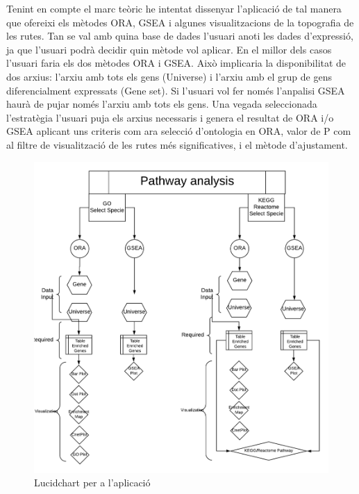 Tenint en compte el marc teòric he intentat dissenyar l'aplicació de tal manera que ofereixi els mètodes \gls{ORA}, \gls{GSEA} i algunes visualitzacions de la topografia de les rutes. Tan se val amb quina base de dades l'usuari anoti les dades d'expressió, ja que l'usuari podrà decidir quin mètode vol aplicar. En el millor dels casos l'usuari faria els dos mètodes ORA i GSEA. Això implicaria la disponibilitat de dos arxius: l'arxiu amb tots els gens (Universe) i l'arxiu amb el grup de gens diferencialment expressats (Gene set). Si l'usuari vol fer només l'anpalisi \gls{GSEA} haurà de pujar només l'arxiu amb tots els gens. Una vegada seleccionada l'estratègia l'usuari puja els arxius necessaris i genera el resultat de \gls{ORA} i/o \gls{GSEA} aplicant uns criteris com ara selecció d'ontologia en ORA, valor de P com al filtre de visualització de les rutes més significatives, i el mètode d'ajustament.

\begin{figure}[H]
\centering
\includegraphics[width=.9\textwidth]{figures/LucidChart} 
\caption{Lucidchart per a l'aplicació}
\end{figure}

